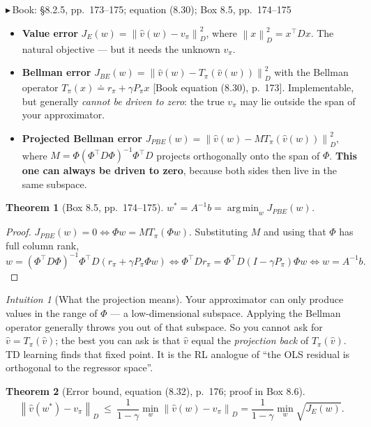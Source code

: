 \documentclass[11pt, letterpaper]{article}
\theoremstyle{runin}
\theoremstyle{runinplain}
\newtheorem{theorem}{Theorem}[section]
\theoremstyle{remark}
\newtheorem*{intuition}{Intuition}
\newcommand{\norm}[1]{\left\lVert #1 \right\rVert}
\newcommand{\argmin}{\operatorname*{arg\,min}}
\newcommand{\bk}[1]{{\color{bookblue}\small$\blacktriangleright$\,\textsf{Book: #1}}}
\newcommand{\bkin}[1]{{\color{bookblue}\small[\textsf{Book #1}]}}
\begin{document}
\bk{\S8.2.5, pp.~173--175; equation (8.30); Box 8.5, pp.~174--175}

\begin{itemize}
  \item \textbf{Value error} $J_E(w)=\norm{\hat v(w)-v_\pi}_D^2$, where
        $\norm{x}_D^2=x^{\!\top}Dx$. The natural objective --- but it needs the
        unknown $v_\pi$.
  \item \textbf{Bellman error}
        $J_{BE}(w)=\norm{\hat v(w)-T_\pi(\hat v(w))}_D^2$ with the Bellman operator
        $T_\pi(x)\doteq r_\pi+\gamma P_\pi x$ \bkin{equation (8.30), p.~173}.
        Implementable, but generally \emph{cannot be driven to zero}: the true
        $v_\pi$ may lie outside the span of your approximator.
  \item \textbf{Projected Bellman error}
        $J_{PBE}(w)=\norm{\hat v(w)-MT_\pi(\hat v(w))}_D^2$, where
        $M=\Phi(\Phi^{\!\top}D\Phi)^{-1}\Phi^{\!\top}D$ projects orthogonally onto
        the span of $\Phi$. \textbf{This one can always be driven to zero}, because
        both sides then live in the same subspace.
\end{itemize}

\begin{theorem}[Box 8.5, pp.~174--175]
$w^*=A^{-1}b=\argmin_w J_{PBE}(w)$.
\end{theorem}

\begin{proof}[Proof]
$J_{PBE}(w)=0\iff\Phi w=M T_\pi(\Phi w)$. Substituting $M$ and using that $\Phi$ has
full column rank,
\[
  w=(\Phi^{\!\top}D\Phi)^{-1}\Phi^{\!\top}D(r_\pi+\gamma P_\pi\Phi w)
  \iff \Phi^{\!\top}Dr_\pi=\Phi^{\!\top}D(I-\gamma P_\pi)\Phi w
  \iff w=A^{-1}b .
\]
\end{proof}

\begin{intuition}[What the projection means]
Your approximator can only produce values in the range of $\Phi$ --- a
low-dimensional subspace. Applying the Bellman operator generally throws you out of
that subspace. So you cannot ask for $\hat v=T_\pi(\hat v)$; the best you can ask is
that $\hat v$ equal the \emph{projection back} of $T_\pi(\hat v)$. TD learning finds
that fixed point. It is the RL analogue of ``the OLS residual is orthogonal to the
regressor space''.
\end{intuition}

\begin{theorem}[Error bound, equation (8.32), p.~176; proof in Box 8.6]
\[
  \norm{\hat v(w^*)-v_\pi}_D\ \le\ \frac{1}{1-\gamma}\min_w\norm{\hat v(w)-v_\pi}_D
  =\frac{1}{1-\gamma}\min_w\sqrt{J_E(w)} .
\]
\end{theorem}
\end{document}
